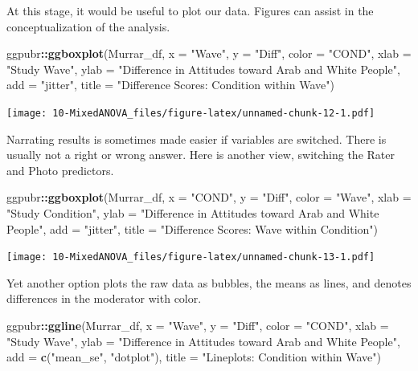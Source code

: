 \documentclass[
  11pt,
]{book}
\newenvironment{Shaded}{\begin{snugshade}}{\end{snugshade}}
\newcommand{\AttributeTok}[1]{\textcolor[rgb]{0.27,0.27,0.27}{#1}}
\newcommand{\FunctionTok}[1]{\textcolor[rgb]{0.27,0.27,0.27}{\textbf{#1}}}
\newcommand{\NormalTok}[1]{#1}
\newcommand{\SpecialCharTok}[1]{\textcolor[rgb]{0.43,0.43,0.43}{\textbf{#1}}}
\newcommand{\StringTok}[1]{\textcolor[rgb]{0.5,0.5,0.5}{#1}}
\begin{document}
At this stage, it would be useful to plot our data. Figures can assist in the conceptualization of the analysis.

\begin{Shaded}
\begin{Highlighting}[]
\NormalTok{ggpubr}\SpecialCharTok{::}\FunctionTok{ggboxplot}\NormalTok{(Murrar\_df, }\AttributeTok{x =} \StringTok{"Wave"}\NormalTok{, }\AttributeTok{y =} \StringTok{"Diff"}\NormalTok{, }\AttributeTok{color =} \StringTok{"COND"}\NormalTok{, }\AttributeTok{xlab =} \StringTok{"Study Wave"}\NormalTok{,}
    \AttributeTok{ylab =} \StringTok{"Difference in Attitudes toward Arab and White People"}\NormalTok{, }\AttributeTok{add =} \StringTok{"jitter"}\NormalTok{,}
    \AttributeTok{title =} \StringTok{"Difference Scores: Condition within Wave"}\NormalTok{)}
\end{Highlighting}
\end{Shaded}

\texttt{[image: 10-MixedANOVA\_files/figure-latex/unnamed-chunk-12-1.pdf]}

Narrating results is sometimes made easier if variables are switched. There is usually not a right or wrong answer. Here is another view, switching the Rater and Photo predictors.

\begin{Shaded}
\begin{Highlighting}[]
\NormalTok{ggpubr}\SpecialCharTok{::}\FunctionTok{ggboxplot}\NormalTok{(Murrar\_df, }\AttributeTok{x =} \StringTok{"COND"}\NormalTok{, }\AttributeTok{y =} \StringTok{"Diff"}\NormalTok{, }\AttributeTok{color =} \StringTok{"Wave"}\NormalTok{, }\AttributeTok{xlab =} \StringTok{"Study Condition"}\NormalTok{,}
    \AttributeTok{ylab =} \StringTok{"Difference in Attitudes toward Arab and White People"}\NormalTok{, }\AttributeTok{add =} \StringTok{"jitter"}\NormalTok{,}
    \AttributeTok{title =} \StringTok{"Difference Scores: Wave within Condition"}\NormalTok{)}
\end{Highlighting}
\end{Shaded}

\texttt{[image: 10-MixedANOVA\_files/figure-latex/unnamed-chunk-13-1.pdf]}

Yet another option plots the raw data as bubbles, the means as lines, and denotes differences in the moderator with color.

\begin{Shaded}
\begin{Highlighting}[]
\NormalTok{ggpubr}\SpecialCharTok{::}\FunctionTok{ggline}\NormalTok{(Murrar\_df, }\AttributeTok{x =} \StringTok{"Wave"}\NormalTok{, }\AttributeTok{y =} \StringTok{"Diff"}\NormalTok{, }\AttributeTok{color =} \StringTok{"COND"}\NormalTok{, }\AttributeTok{xlab =} \StringTok{"Study Wave"}\NormalTok{,}
    \AttributeTok{ylab =} \StringTok{"Difference in Attitudes toward Arab and White People"}\NormalTok{, }\AttributeTok{add =} \FunctionTok{c}\NormalTok{(}\StringTok{"mean\_se"}\NormalTok{,}
        \StringTok{"dotplot"}\NormalTok{), }\AttributeTok{title =} \StringTok{"Lineplots: Condition within Wave"}\NormalTok{)}
\end{Highlighting}
\end{Shaded}
\end{document}
